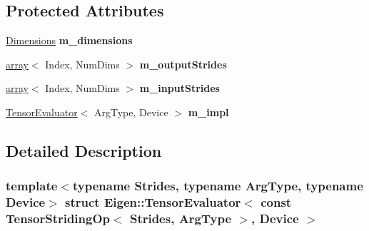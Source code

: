 \subsection*{Protected Attributes}
\begin{DoxyCompactItemize}
\item 
\mbox{\label{struct_eigen_1_1_tensor_evaluator_3_01const_01_tensor_striding_op_3_01_strides_00_01_arg_type_01_4_00_01_device_01_4_a902bac8f01d412065bde4caa5ce9fee5}} 
\hyperlink{struct_eigen_1_1_d_sizes}{Dimensions} {\bfseries m\+\_\+dimensions}
\item 
\mbox{\label{struct_eigen_1_1_tensor_evaluator_3_01const_01_tensor_striding_op_3_01_strides_00_01_arg_type_01_4_00_01_device_01_4_a7d4c19e3929fa44f750db57e733e61ee}} 
\hyperlink{class_eigen_1_1array}{array}$<$ Index, Num\+Dims $>$ {\bfseries m\+\_\+output\+Strides}
\item 
\mbox{\label{struct_eigen_1_1_tensor_evaluator_3_01const_01_tensor_striding_op_3_01_strides_00_01_arg_type_01_4_00_01_device_01_4_a4369d381e11a2ee7eaa6e1b1273accb1}} 
\hyperlink{class_eigen_1_1array}{array}$<$ Index, Num\+Dims $>$ {\bfseries m\+\_\+input\+Strides}
\item 
\mbox{\label{struct_eigen_1_1_tensor_evaluator_3_01const_01_tensor_striding_op_3_01_strides_00_01_arg_type_01_4_00_01_device_01_4_a270a4629f81446de25f3e084c9d5c61d}} 
\hyperlink{struct_eigen_1_1_tensor_evaluator}{Tensor\+Evaluator}$<$ Arg\+Type, Device $>$ {\bfseries m\+\_\+impl}
\end{DoxyCompactItemize}


\subsection{Detailed Description}
\subsubsection*{template$<$typename Strides, typename Arg\+Type, typename Device$>$\newline
struct Eigen\+::\+Tensor\+Evaluator$<$ const Tensor\+Striding\+Op$<$ Strides, Arg\+Type $>$, Device $>$}



